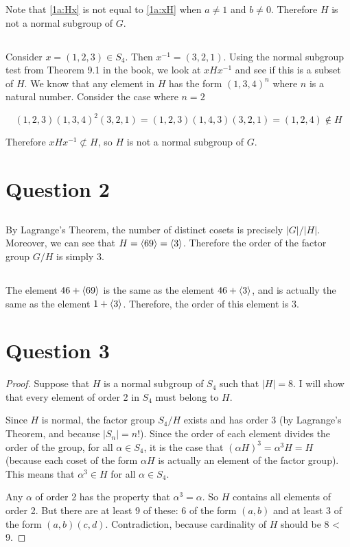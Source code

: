 \documentclass[a4paper,12pt]{article}
\DeclarePairedDelimiter{\gen}{\langle}{\rangle}
\numberwithin{equation}{section}
\begin{document}
Note that \eqref{1a:Hx} is not equal to \eqref{1a:xH} when $a \neq 1$ and $b \neq 0$. Therefore $H$ is not a normal subgroup of $G$.

\subsection{}
Consider $x = (1, 2, 3) \in S_4$. Then $x^{-1} = (3, 2, 1)$. Using the normal subgroup test from Theorem 9.1 in the book, we look at $xHx^{-1}$ and see if this is a subset of $H$. We know that any element in $H$ has the form $(1, 3, 4)^n$ where $n$ is a natural number. Consider the case where $n = 2$

\begin{equation}
(1, 2, 3)(1, 3, 4)^2(3, 2, 1) = (1, 2, 3)(1, 4, 3)(3, 2, 1) = (1, 2, 4) \notin H
\end{equation}

Therefore $xHx^{-1} \not\subset H$, so $H$ is not a normal subgroup of $G$.

\section{Question 2}

\subsection{}
By Lagrange's Theorem, the number of distinct cosets is precisely $|G| / |H|$. Moreover, we can see that $H = \gen{69} = \gen{3}$. Therefore the order of the factor group $G / H$ is simply 3.

\subsection{}
The element $46 + \gen{69}$ is the same as the element $46 + \gen{3}$, and is actually the same as the element $1 + \gen{3}$. Therefore, the order of this element is 3.

\section{Question 3}

\begin{proof}
Suppose that $H$ is a normal subgroup of $S_4$ such that $|H| = 8$. I will show that every element of order 2 in $S_4$ must belong to $H$.

Since $H$ is normal, the factor group $S_4 / H$ exists and has order 3 (by Lagrange's Theorem, and because $|S_n| = n!$). Since the order of each element divides the order of the group, for all $\alpha \in S_4$, it is the case that $(\alpha H)^3 = \alpha^3 H = H$ (because each coset of the form $\alpha H$ is actually an element of the factor group). This means that $\alpha^3 \in H$ for all $\alpha \in S_4$.

Any $\alpha$ of order 2 has the property that $\alpha^3 = \alpha$. So $H$ contains all elements of order 2. But there are at least 9 of these: 6 of the form $(a, b)$ and at least 3 of the form $(a, b)(c, d)$. Contradiction, because cardinality of $H$ should be 8 < 9.

\end{proof}
\end{document}
